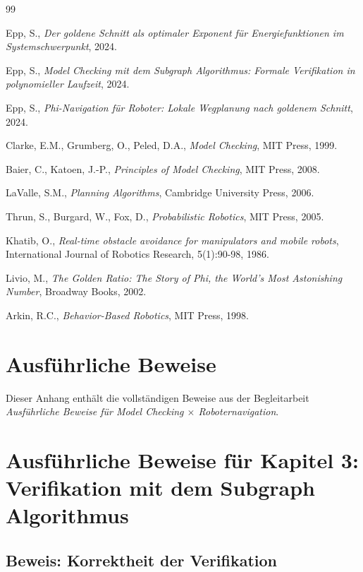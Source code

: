 ﻿\documentclass[a4paper,12pt]{article}
\theoremstyle{definition}
\begin{document}
\begin{thebibliography}{99}
	
	Epp, S.,
	\textit{Der goldene Schnitt als optimaler Exponent für Energiefunktionen im Systemschwerpunkt},
	2024.
	
	Epp, S.,
	\textit{Model Checking mit dem Subgraph Algorithmus: Formale Verifikation in polynomieller Laufzeit},
	2024.
	
	Epp, S.,
	\textit{Phi-Navigation für Roboter: Lokale Wegplanung nach goldenem Schnitt},
	2024.
	
	Clarke, E.M., Grumberg, O., Peled, D.A.,
	\textit{Model Checking},
	MIT Press, 1999.
	
	Baier, C., Katoen, J.-P.,
	\textit{Principles of Model Checking},
	MIT Press, 2008.
	
	LaValle, S.M.,
	\textit{Planning Algorithms},
	Cambridge University Press, 2006.
	
	Thrun, S., Burgard, W., Fox, D.,
	\textit{Probabilistic Robotics},
	MIT Press, 2005.
	
	Khatib, O.,
	\textit{Real-time obstacle avoidance for manipulators and mobile robots},
	International Journal of Robotics Research, 5(1):90-98, 1986.
	
	Livio, M.,
	\textit{The Golden Ratio: The Story of Phi, the World's Most Astonishing Number},
	Broadway Books, 2002.
	
	Arkin, R.C.,
	\textit{Behavior-Based Robotics},
	MIT Press, 1998.
	
\end{thebibliography}

\appendix
\section{Ausführliche Beweise}
\label{app:beweise}

Dieser Anhang enthält die vollständigen Beweise aus der Begleitarbeit \textit{Ausführliche Beweise für Model Checking $\times$ Roboternavigation}.

\section{Ausführliche Beweise für Kapitel 3: Verifikation mit dem Subgraph Algorithmus}

\subsection{Beweis: Korrektheit der Verifikation}
\end{document}
